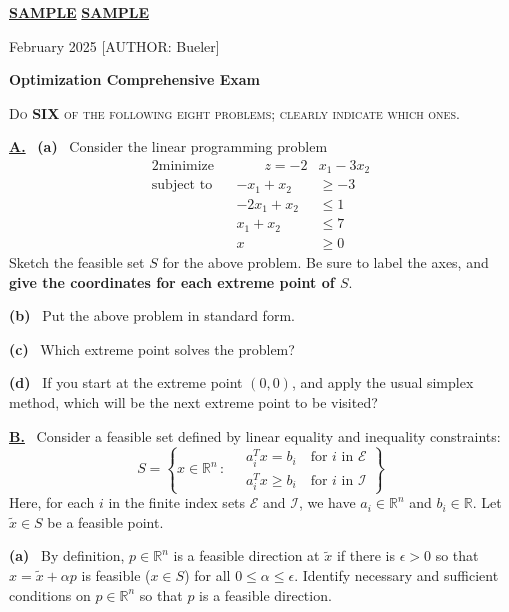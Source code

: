 \documentclass[11pt]{amsart}
\newcommand{\RR}{{\mathbb{R}}}
\newcommand{\eps}{\epsilon}
\newcommand{\prob}[1]{\bigskip\noindent\large\textbf{\underline{#1.}} \, \normalsize}
\newcommand{\apart}[1]{\textbf{(#1)} \,}
\newcommand{\epart}[1]{\medskip\noindent \textbf{(#1)} \,}
\begin{document}
\thispagestyle{empty}
\Large \noindent \underline{\textbf{SAMPLE}} \hfill\underline{\textbf{SAMPLE}}

\scriptsize \noindent February 2025  \hfill  \tiny [AUTHOR: Bueler]
\normalsize\bigskip

\centerline{\large \textbf{Optimization Comprehensive Exam}}
\bigskip

\centerline{\textsc{Do \textbf{SIX} of the following eight problems; clearly indicate which ones.}}
\smallskip

\thispagestyle{empty}

\prob{A}  \apart{a} Consider the linear programming problem
\begin{alignat*}{2}
    \text{minimize}   && \qquad z = - 2 &x_1 - 3 x_2 \\
    \text{subject to} && -x_1 + x_2 &\ge -3 \\
                      && - 2 x_1 + x_2 &\le 1 \\
                      && x_1 + x_2 & \le 7 \\
                      && x &\ge 0
\end{alignat*}
Sketch the feasible set $S$ for the above problem.  Be sure to label the axes, and \textbf{give the coordinates for each extreme point of $S$}.

\epart{b} Put the above problem in standard form.

\epart{c} Which extreme point solves the problem?

\epart{d} If you start at the extreme point $(0,0)$, and apply the usual simplex method, which will be the next extreme point to be visited?


\prob{B}  Consider a feasible set defined by linear equality and inequality constraints:
	$$S = \left\{x \in \RR^n\,:\quad \begin{matrix}
	a_i^T x = b_i \quad \text{for $i$ in $\mathcal{E}$} \\
	a_i^T x \ge b_i \quad \text{for $i$ in $\mathcal{I}$}
	\end{matrix}\right\}$$
Here, for each $i$ in the finite index sets $\mathcal{E}$ and $\mathcal{I}$, we have $a_i\in \RR^n$ and $b_i\in\RR$.  Let $\tilde x\in S$ be a feasible point.

\epart{a}  By definition, $p\in\RR^n$ is a feasible direction at $\tilde x$ if there is $\eps>0$ so that $x = \tilde x + \alpha p$ is feasible ($x\in S$) for all $0\le \alpha \le \eps$.  Identify necessary and sufficient conditions on $p\in\RR^n$ so that $p$ is a feasible direction.
\end{document}
